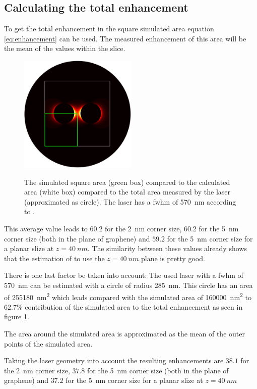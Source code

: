 \subsection{Calculating the total enhancement}

To get the total enhancement in the square simulated area equation \ref{eq:enhancement} can be used. The measured enhancement of this area will be the mean of the values within the slice.

\begin{figure}[!h]
  \centering
  \includegraphics[width=0.5\textwidth]{./images/fwhm-chart.jpg}
  \label{fig:symmetry}
  \caption{The simulated square area (green box) compared to the calculated area (white box) compared to the total area measured by the laser (approximated as circle). The laser has a fwhm of \SI{570}{nm} according to \cite{heeg}.}
\end{figure}

This average value leads to $60.2$ for the \SI{2}{nm} corner size, $60.2$ for the \SI{5}{nm} corner size (both in the plane of graphene) and $59.2$ for the \SI{5}{nm} corner size for a planar slize at $z=\SI{40}{nm}$. The similarity between these values already shows that the estimation of \cite{heeg} to use the $z=\SI{40}{nm}$ plane is pretty good.

There is one last factor be taken into account: The used laser with a fwhm of \SI{570}{nm} can be estimated with a circle of radius \SI{285}{nm}. This circle has an area of \SI{255 180}{nm^2} which leads compared with the simulated area of \SI{160 000}{nm^2} to $62.7\%$ contribution of the simulated area to the total enhancement as seen in figure \ref{fig:symmetry}.

The area around the simulated area is approximated as the mean of the outer points of the simulated area.

Taking the laser geometry into account the resulting enhancements are $38.1$ for the \SI{2}{nm} corner size, $37.8$ for the \SI{5}{nm} corner size (both in the plane of graphene) and $37.2$ for the \SI{5}{nm} corner size for a planar slize at $z=\SI{40}{nm}$

